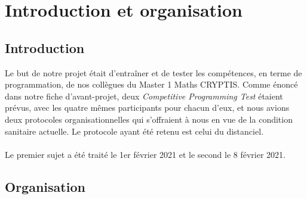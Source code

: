 \documentclass[12pt]{article}
\begin{document}
\tableofcontents
\pagebreak

\section{Introduction et organisation}

\subsection{Introduction}
Le but de notre projet était d'entraîner et de tester les compétences, en terme de programmation, de nos collègues du \textsf{Master 1 Maths CRYPTIS}. Comme énoncé dans notre fiche d'avant-projet, deux \textsl{Competitive Programming Test} étaient prévus, avec les quatre mêmes participants pour chacun d'eux, et nous avions deux protocoles organisationnelles qui s'offraient à nous en vue de la condition sanitaire actuelle. Le protocole ayant été retenu est celui du distanciel.\\
\\
Le premier sujet a été traité le 1er février 2021 et le second le 8 février 2021.

\subsection{Organisation}
\end{document}

